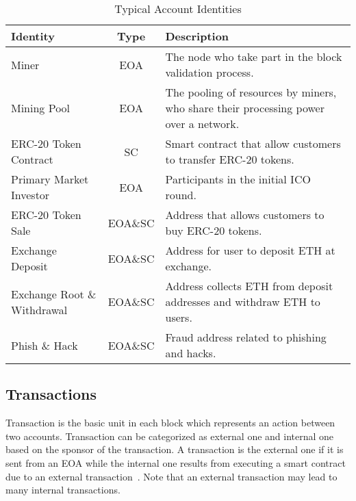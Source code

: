 \begin{table}[htbp]
\caption{Typical Account Identities}
\begin{center}
\begin{tabular}{|p{1.8cm}|c|p{3.9cm}|}
\hline
\textbf{Identity} & \textbf{Type}& \textbf{Description} \\
\hline
Miner & EOA & The node who take part in the block validation process. \\ \hline
Mining Pool & EOA & The pooling of resources by miners, who share their processing power over a network.\\ \hline
ERC-20 Token Contract & SC & Smart contract that allow customers to transfer ERC-20 tokens. \\ \hline
Primary Market Investor & EOA & Participants in the initial ICO round. \\ \hline
ERC-20 Token Sale & EOA\&SC & Address that allows customers to buy ERC-20 tokens. \\ \hline
Exchange Deposit & EOA\&SC & Address for user to deposit ETH at exchange. \\ \hline
Exchange Root \& Withdrawal & EOA\&SC & Address collects ETH from deposit addresses and withdraw ETH to users. \\ \hline
Phish \& Hack & EOA\&SC & Fraud address related to phishing and hacks. \\ \hline
\end{tabular}
\label{tab1}
\end{center}
\end{table}






\subsection{Transactions}
Transaction is the basic unit in each block which represents an action between two accounts. Transaction can be categorized as external one and internal one based on the sponsor of the transaction. A transaction is the external one if it is sent from an EOA while the internal one results from executing a smart contract due to an external transaction~\cite{chen2018infocom}. Note that an external transaction may lead to many internal transactions.

